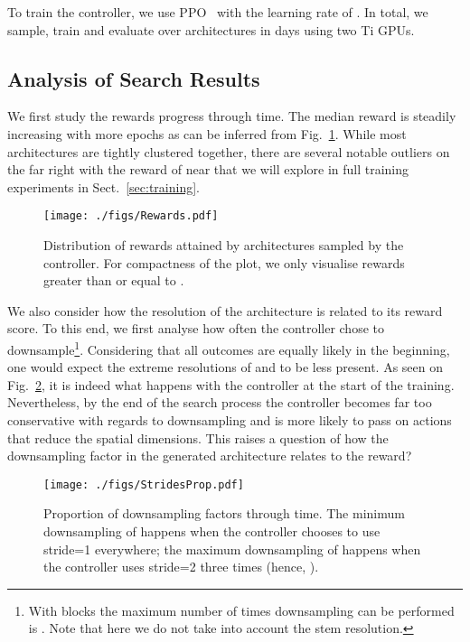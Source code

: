 \documentclass[10pt,twocolumn,letterpaper]{article}
\begin{document}
To train the controller, we use PPO~\cite{SchulmanWDRK17} with the learning rate of . In total, we sample, train and evaluate over  architectures in  days using two Ti GPUs.

\subsection{Analysis of Search Results}

We first study the rewards progress through time. The median reward is steadily increasing with more epochs as can be inferred from Fig.~\ref{fig:rewards}. While most architectures are tightly clustered together, there are several notable outliers on the far right with the reward of near  that we will explore in full training experiments in Sect.~\ref{sec:training}.


\begin{figure}[thb]
	\begin{center}
		\texttt{[image: ./figs/Rewards.pdf]}
	\end{center}
	\vskip -0.2in
	\caption{Distribution of rewards attained by architectures sampled by the controller. For compactness of the plot, we only visualise rewards greater than or equal to .\label{fig:rewards}}
	\vskip -0.2in
\end{figure}

We also consider how the resolution of the architecture is related to its reward score. To this end, we first analyse how often the controller chose to downsample\footnote{With  blocks the maximum number of times downsampling can be performed is . Note that here we do not take into account the stem resolution.}. Considering that all outcomes are equally likely in the beginning, one would expect the extreme resolutions of  and  to be less present. As seen on Fig.~\ref{fig:strides}, it is indeed what happens with the controller at the start of the training. Nevertheless, by the end of the search process the controller becomes far too conservative with regards to downsampling and is more likely to pass on actions that reduce the spatial dimensions. This raises a question of how the downsampling factor in the generated architecture relates to the reward?

\begin{figure}[thb]
	\begin{center}
		\texttt{[image: ./figs/StridesProp.pdf]}
	\end{center}
	\vskip -0.2in
	\caption{Proportion of downsampling factors through time. The minimum downsampling of  happens when the controller chooses to use stride=1 everywhere; the maximum downsampling of  happens when the controller uses stride=2 three times (hence, ).\label{fig:strides}}
\end{figure}
\end{document}

